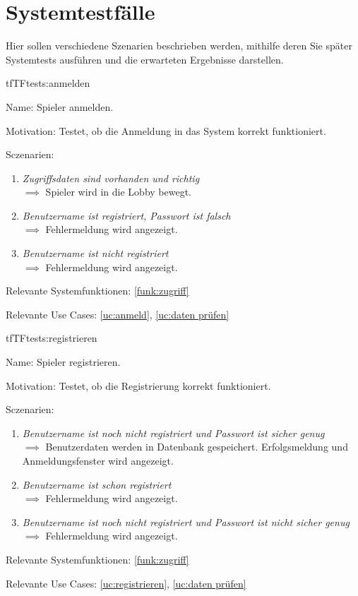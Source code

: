 \chapter{Systemtestfälle}

Hier sollen verschiedene Szenarien beschrieben werden, mithilfe deren Sie später Systemtests ausführen und die erwarteten Ergebnisse darstellen.

\setcounter{tf}{10}

\begin{description}[leftmargin=5em, style=sameline]

\begin{lhp}{tf}{TF}{tests:anmelden}
	\item [Name:] Spieler anmelden.
	\item [Motivation:] Testet, ob die Anmeldung in das System korrekt funktioniert.
	\item [Sczenarien:] \hfill
		\begin{enumerate}
			\item \textit{Zugriffsdaten sind vorhanden und richtig} \\ $\implies$ Spieler wird in die Lobby bewegt.
			\item \textit{Benutzername ist registriert, Passwort ist falsch} \\ $\implies$ Fehlermeldung wird angezeigt.
			\item \textit{Benutzername ist nicht registriert} \\ $\implies$ Fehlermeldung wird angezeigt.
		\end{enumerate}
	\item [Relevante Systemfunktionen:] \ref{funk:zugriff}
	\item [Relevante Use Cases:] \ref{uc:anmeld}, \ref{uc:daten prüfen}
\end{lhp}

\begin{lhp}{tf}{TF}{tests:registrieren}
	\item [Name:] Spieler registrieren.
	\item [Motivation:] Testet, ob die Registrierung korrekt funktioniert.
	\item [Sczenarien:] \hfill
		\begin{enumerate}
			\item \textit{Benutzername ist noch nicht registriert und Passwort ist sicher genug} \\ $\implies$ Benutzerdaten werden in Datenbank gespeichert. Erfolgsmeldung und Anmeldungsfenster wird angezeigt.
			\item \textit{Benutzername ist schon registriert} \\ $\implies$ Fehlermeldung wird angezeigt.
			\item \textit{Benutzername ist noch nicht registriert und Passwort ist nicht sicher genug} \\ $\implies$ Fehlermeldung wird angezeigt.
		\end{enumerate}
	\item [Relevante Systemfunktionen:] \ref{funk:zugriff}
	\item [Relevante Use Cases:] \ref{uc:registrieren}, \ref{uc:daten prüfen}
\end{lhp}


\end{description}
